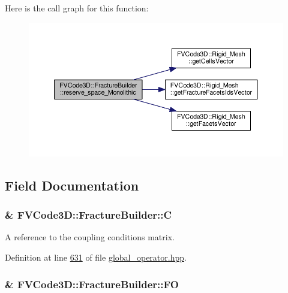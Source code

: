 Here is the call graph for this function\+:
\nopagebreak
\begin{figure}[H]
\begin{center}
\leavevmode
\includegraphics[width=350pt]{classFVCode3D_1_1FractureBuilder_af3f7ade53f75d44dbb523b697bced516_cgraph}
\end{center}
\end{figure}




\subsection{Field Documentation}
\subsubsection[{\texorpdfstring{C}{C}}]{\& F\+V\+Code3\+D\+::\+Fracture\+Builder\+::C\hspace{0.3cm}{\ttfamily [private]}}\hypertarget{classFVCode3D_1_1FractureBuilder_a8fd06afa6c18949cfdb034db10775ace}{}\label{classFVCode3D_1_1FractureBuilder_a8fd06afa6c18949cfdb034db10775ace}


A reference to the coupling conditions matrix. 



Definition at line \hyperlink{global__operator_8hpp_source_l00631}{631} of file \hyperlink{global__operator_8hpp_source}{global\+\_\+operator.\+hpp}.

\subsubsection[{\texorpdfstring{FO}{FO}}]{\& F\+V\+Code3\+D\+::\+Fracture\+Builder\+::\+FO\hspace{0.3cm}{\ttfamily [private]}}\hypertarget{classFVCode3D_1_1FractureBuilder_aa9979563fab859667fc6fc242d6e461c}{}\label{classFVCode3D_1_1FractureBuilder_aa9979563fab859667fc6fc242d6e461c}


